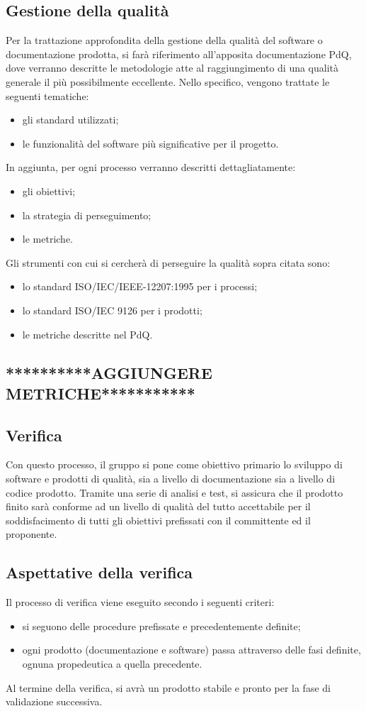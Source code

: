 \subsection{Gestione della qualità}
Per la trattazione approfondita della gestione della qualità del software o documentazione prodotta, si farà riferimento all’apposita documentazione PdQ, dove verranno descritte le metodologie atte al raggiungimento di una qualità generale il più possibilmente eccellente. Nello specifico, vengono trattate le seguenti tematiche:
\begin{itemize}
	\item gli standard utilizzati;
	\item le funzionalità del software più significative per il progetto. 
\end{itemize}
In aggiunta, per ogni processo verranno descritti dettagliatamente:
\begin{itemize}
	\item gli obiettivi;
	\item la strategia di perseguimento;
	\item le metriche.
\end{itemize}
Gli strumenti con cui si cercherà di perseguire la qualità sopra citata sono:
\begin{itemize}
	\item lo standard ISO/IEC/IEEE-12207:1995 per i processi;
	\item lo standard ISO/IEC 9126 per i prodotti;
	\item le metriche descritte nel PdQ.
\end{itemize}

\subsection*{**********AGGIUNGERE METRICHE***********}

\subsection{Verifica}
Con questo processo, il gruppo {\Gruppo} si pone come obiettivo primario lo sviluppo di software e prodotti di qualità, sia a livello di documentazione sia a livello di codice prodotto. Tramite una serie di analisi e test, si assicura che il prodotto finito sarà conforme ad un livello di qualità del tutto accettabile per il soddisfacimento di tutti gli obiettivi prefissati con il committente ed il proponente.
\subsection{Aspettative della verifica}
Il processo di verifica viene eseguito secondo i seguenti criteri:
\begin{itemize}
	\item si seguono delle procedure prefissate e precedentemente definite;
	\item ogni prodotto (documentazione e software) passa attraverso delle fasi definite, ognuna propedeutica a quella precedente.
	\end{itemize}
Al termine della verifica, si avrà un prodotto stabile e pronto per la fase di validazione successiva.

